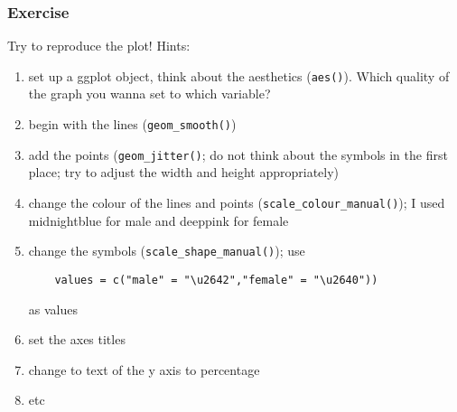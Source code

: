 \begin{frame}[fragile]\frametitle{Exercise}
Try to reproduce the plot! Hints:
  \begin{enumerate}
  \item set up a ggplot object, think about the aesthetics (\texttt{aes()}). Which quality of the graph you wanna set to which variable?
  \item begin with the lines (\texttt{geom\_smooth()})
  \item add the points (\texttt{geom\_jitter()}; do not think about the symbols in the first place; try to adjust the width and height appropriately)
  \item change the colour of the lines and points (\texttt{scale\_colour\_manual()}); I used midnightblue for male and deeppink for female
  \item change the symbols (\texttt{scale\_shape\_manual()}); use
\begin{verbatim}
    values = c("male" = "\u2642","female" = "\u2640"))
\end{verbatim}
     as values
  \item set the axes titles
  \item change to text of the y axis to percentage
  \item etc
  \end{enumerate}
\end{frame}





